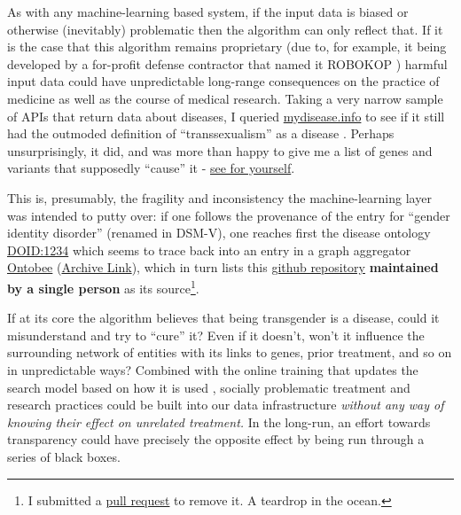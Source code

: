 \documentclass[10pt]{article}
\begin{document}
\begin{multicols}{2}
As with any machine-learning based system, if the input data is biased
or otherwise (inevitably) problematic then the algorithm can only
reflect that. If it is the case that this algorithm remains proprietary
(due to, for example, it being developed by a for-profit defense
contractor that named it ROBOKOP \cite{ROBOKOPCoVar2021} )
harmful input data could have unpredictable long-range consequences on
the practice of medicine as well as the course of medical research.
Taking a very narrow sample of APIs that return data about diseases, I
queried \href{https://mydisease.info}{mydisease.info} to see if it still
had the outmoded definition of ``transsexualism'' as a disease \cite{ramTransphobiaEncodedExamination2021} . Perhaps unsurprisingly, it
did, and was more than happy to give me a list of genes and variants
that supposedly ``cause'' it -
\href{http://mydisease.info/v1/query?q=\%22DOID\%3A10919\%22}{see for
yourself}.

This is, presumably, the fragility and inconsistency the
machine-learning layer was intended to putty over: if one follows the
provenance of the entry for ``gender identity disorder'' (renamed in
DSM-V), one reaches first the disease ontology
\href{https://web.archive.org/web/20211007053446/https://www.ebi.ac.uk/ols/ontologies/doid/terms?iri=http\%3A\%2F\%2Fpurl.obolibrary.org\%2Fobo\%2FDOID_1234}{DOID:1234}
which seems to trace back into an entry in a graph aggregator
\href{http://www.ontobee.org/ontology/DOID?iri=http://purl.obolibrary.org/obo/DOID_1234}{Ontobee}
(\href{https://web.archive.org/web/20210923110103/http://www.ontobee.org/ontology/DOID?iri=http://purl.obolibrary.org/obo/DOID_1234}{Archive
Link}), which in turn lists this
\href{https://github.com/jannahastings/mental-functioning-ontology}{github
repository} \textbf{maintained by a single person} as its
source\footnote{I submitted a
  \href{https://github.com/jannahastings/mental-functioning-ontology/pull/8}{pull
  request} to remove it. A teardrop in the ocean.}.

If at its core the algorithm believes that being transgender is a
disease, could it misunderstand and try to ``cure'' it? Even if it
doesn't, won't it influence the surrounding network of entities with its
links to genes, prior treatment, and so on in unpredictable ways?
Combined with the online training that updates the search model based on
how it is used \cite{consortiumUniversalBiomedicalData2019} ,
socially problematic treatment and research practices could be built
into our data infrastructure \emph{without any way of knowing their
effect on unrelated treatment.} In the long-run, an effort towards
transparency could have precisely the opposite effect by being run
through a series of black boxes.


\end{multicols}
\end{document}
